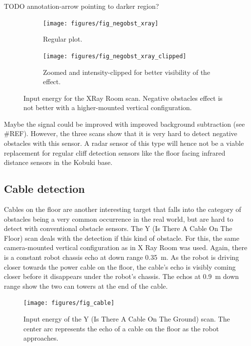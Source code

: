 TODO annotation-arrow pointing to darker region?

\begin{figure}[htbp]
    \centering
    \begin{subfigure}[t]{.475\textwidth}
        \texttt{[image: figures/fig\_negobst\_xray]}
        \caption{Regular plot.}
        \label{fig:negobst_xray}
    \end{subfigure}%
    \hfill%
    \begin{subfigure}[t]{.475\textwidth}
        \texttt{[image: figures/fig\_negobst\_xray\_clipped]}
        \caption{Zoomed and intensity-clipped for better visibility of the effect.}
        \label{fig:negobst_xray_clipped}
    \end{subfigure}
    \caption{Input energy for the XRay Room scan. Negative obstacles effect is not better with a higher-mounted vertical configuration.}
\end{figure}


Maybe the signal could be improved with improved background subtraction
(see \#REF). However, the three scans show that it is very hard to
detect negative obstacles with this sensor. A radar sensor of this type
will hence not be a viable replacement for regular cliff detection
sensors like the floor facing infrared distance sensors in the Kobuki
base.

\subsection{Cable detection}\label{cable-detection}

Cables on the floor are another interesting target that falls into the
category of obstacles being a very common occurrence in the real world,
but are hard to detect with conventional obstacle sensors. The Y (Is
There A Cable On The Floor) scan deals with the detection if this kind
of obstacle. For this, the same camera-mounted vertical configuration as
in X Ray Room was used. Again, there is a constant robot chassis echo at
down range \SI{0.35}{m}. As the robot is driving closer towards the power cable
on the floor, the cable's echo is visibly coming closer before it
disappears under the robot's chassis. The echos at \SI{0.9}{m} down range show
the two can towers at the end of the cable.

\begin{figure}[htp]
    \centering
    \texttt{[image: figures/fig\_cable]}
    \caption{Input energy of the Y (Is There A Cable On The Ground) scan. The center arc represents the echo of a cable on the floor as the robot approaches.}
    \label{fig:cable}
\end{figure}

